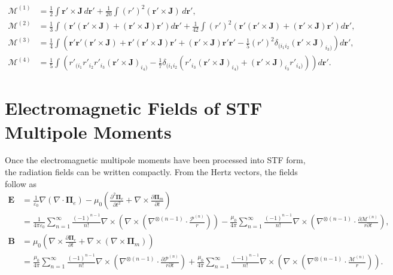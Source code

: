 \documentclass{article}
\begin{document}
\[\begin{split}
		\bm{\mathcal{M}}^{(1)} &= \frac{1}{2} \int \bm{r}' \times \bm{J} \, d\bm{r}' + \frac{1}{20} \int (r')^2 (\bm{r}' \times \bm{J}) \, d\bm{r}', \\
		\bm{\mathcal{M}}^{(2)} &= \frac{1}{3} \int \left( \bm{r}' (\bm{r}' \times \bm{J}) + (\bm{r}' \times \bm{J}) \bm{r}' \right) d\bm{r}'
		+ \frac{1}{42} \int (r')^2 \left( \bm{r}' (\bm{r}' \times \bm{J}) + (\bm{r}' \times \bm{J}) \bm{r}' \right) d\bm{r}', \\
		\bm{\mathcal{M}}^{(3)} &= \frac{1}{4} \int \left( \bm{r}' \bm{r}' (\bm{r}' \times \bm{J}) + \bm{r}' (\bm{r}' \times \bm{J}) \bm{r}' + (\bm{r}' \times \bm{J}) \bm{r}' \bm{r}' - \frac{1}{5} (r')^2 \delta_{(i_1 i_2} (\bm{r}' \times \bm{J})_{i_3)} \right) d\bm{r}', \\
		\bm{\mathcal{M}}^{(4)} &= \frac{1}{5} \int \left( r'_{(i_1} r'_{i_2} r'_{i_3} (\bm{r}' \times \bm{J})_{i_4)} - \frac{1}{7} \delta_{(i_1 i_2} \left( r'_{i_3} (\bm{r}' \times \bm{J})_{i_4)} + (\bm{r}' \times \bm{J})_{i_3} r'_{i_4)} \right) \right) d\bm{r}'.
	\end{split}
	\]
	
	\section{Electromagnetic Fields of STF Multipole Moments}
	
	Once the electromagnetic multipole moments have been processed into STF form, the radiation fields can be written compactly. From the Hertz vectors, the fields follow as
	\[
	\begin{split}
		\bm{E} &= \frac{1}{\varepsilon_0} \nabla (\nabla \cdot \bm{\Pi}_e)
		- \mu_0 \left( \frac{\partial^2 \bm{\Pi}_e}{\partial t^2} + \nabla \times \frac{\partial \bm{\Pi}_m}{\partial t} \right) \\
		&= \frac{1}{4\pi \varepsilon_0} \sum_{n=1}^{\infty} \frac{(-1)^{n-1}}{n!}
		\nabla \times \left( \nabla \times \left( \nabla^{\otimes (n-1)} \cdot \frac{\bm{\mathcal{P}}^{(n)}}{r} \right) \right)
		- \frac{\mu_0}{4\pi} \sum_{n=1}^{\infty} \frac{(-1)^{n-1}}{n!}
		\nabla \times \left( \nabla^{\otimes (n-1)} \cdot \frac{\partial \bm{\mathcal{M}}^{(n)}}{r \partial t} \right), \\
		\bm{B} &= \mu_0 \left( \nabla \times \frac{\partial \bm{\Pi}_e}{\partial t}
		+ \nabla \times (\nabla \times \bm{\Pi}_m) \right) \\
		&= \frac{\mu_0}{4\pi} \sum_{n=1}^{\infty} \frac{(-1)^{n-1}}{n!}
		\nabla \times \left( \nabla^{\otimes (n-1)} \cdot \frac{\partial \bm{\mathcal{P}}^{(n)}}{r \partial t} \right)
		+ \frac{\mu_0}{4\pi} \sum_{n=1}^{\infty} \frac{(-1)^{n-1}}{n!}
		\nabla \times \left( \nabla \times \left( \nabla^{\otimes (n-1)} \cdot \frac{\bm{\mathcal{M}}^{(n)}}{r} \right) \right).
	\end{split}
	\]
	
\end{document}
